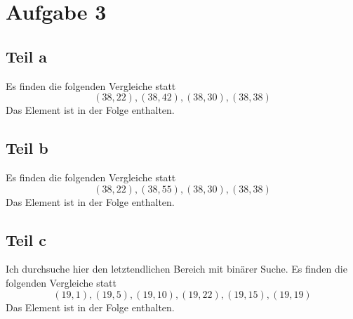 \documentclass[10pt,a4paper]{article}
\begin{document}
\section{Aufgabe 3}

\subsection{Teil a}
Es finden die folgenden Vergleiche statt
\begin{equation}
  (38, 22), (38, 42), (38, 30), (38, 38)
\end{equation}
Das Element ist in der Folge enthalten.

\subsection{Teil b}
Es finden die folgenden Vergleiche statt
\begin{equation}
  (38, 22), (38, 55), (38, 30), (38, 38)
\end{equation}
Das Element ist in der Folge enthalten.

\subsection{Teil c}
Ich durchsuche hier den letztendlichen Bereich mit binärer Suche.
Es finden die folgenden Vergleiche statt
\begin{equation}
  (19, 1), (19, 5), (19, 10), (19, 22), (19, 15), (19, 19)
\end{equation}
Das Element ist in der Folge enthalten.
\end{document}
